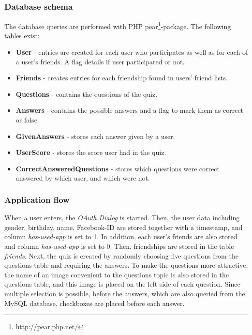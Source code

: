 \documentclass[preprint,12pt]{elsarticle}
\begin{document}
\subsubsection{Database schema}
\label{sec:database-schema}
The database queries are performed with PHP
pear\footnote{http://pear.php.net/}-package. The following tables exist:
\begin{itemize}
\item \textbf{User} - entries are created for each user who participates as
well as for each of a user's friends. A flag details if user
participated or not.
\item \textbf{Friends} - creates entries for each friendship found in
users' friend lists.
\item \textbf{Questions} - contains the questions of the quiz.
\item \textbf{Answers} - contains the possible answers and a flag to mark them
as correct or false.
\item \textbf{GivenAnswers} - stores each answer given by a user.
\item \textbf{UserScore} - stores the score user had in the quiz.
\item \textbf{CorrectAnsweredQuestions} - stores which questions were correct
answered by which user, and which were not.
\end{itemize}

\subsubsection{Application flow}
\label{sec:application-flow}
When a user enters, the \textit{OAuth Dialog} is started. Then, the user data
including gender, birthday, name, Facebook-ID are stored together with
a timestamp, and column \textit{has-used-app} is set to 1. In
addition, each user's friends are also stored and column
\textit{has-used-app} is set to 0. Then, friendships are stored in the
table \textit{friends}. Next, the quiz is created by randomly choosing
five questions from the questions table and requiring the answers. To
make the questions more attractive, the name of an image convenient to
the questions topic is also stored in the questions table, and this
image is placed on the left side of each question. Since multiple
selection is possible, before the answers, which are also queried from
the MySQL database, checkboxes are placed before each answer. 
\end{document}
